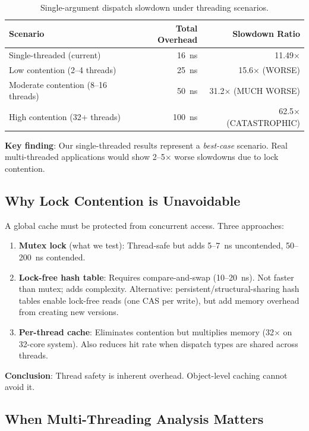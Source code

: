 \documentclass[sigplan,final]{acmart}
\begin{document}
\begin{table}[h]
\centering
\caption{Single-argument dispatch slowdown under threading scenarios.}
\label{tab:threading-slowdown}
\begin{tabular}{@{}lrr@{}}
\toprule
\textbf{Scenario} & \textbf{Total Overhead} & \textbf{Slowdown Ratio} \\
\midrule
Single-threaded (current) & 16~ns & 11.49× \\
Low contention (2--4 threads) & 25~ns & 15.6× (WORSE) \\
Moderate contention (8--16 threads) & 50~ns & 31.2× (MUCH WORSE) \\
High contention (32+ threads) & 100~ns & 62.5× (CATASTROPHIC) \\
\bottomrule
\end{tabular}
\end{table}

\textbf{Key finding}: Our single-threaded results represent a \emph{best-case} scenario. Real
multi-threaded applications would show 2--5× worse slowdowns due to lock contention.

\subsection{Why Lock Contention is Unavoidable}

A global cache must be protected from concurrent access. Three approaches:

\begin{enumerate}
  \item \textbf{Mutex lock} (what we test): Thread-safe but adds 5--7~ns uncontended, 50--200~ns contended.

  \item \textbf{Lock-free hash table}: Requires compare-and-swap (10--20~ns). Not faster
    than mutex; adds complexity. Alternative: persistent/structural-sharing hash tables enable
    lock-free reads (one CAS per write), but add memory overhead from creating new versions.

  \item \textbf{Per-thread cache}: Eliminates contention but multiplies memory (32$\times$ on
    32-core system). Also reduces hit rate when dispatch types are shared across threads.
\end{enumerate}

\textbf{Conclusion}: Thread safety is inherent overhead. Object-level caching cannot avoid it.

\subsection{When Multi-Threading Analysis Matters}
\end{document}
